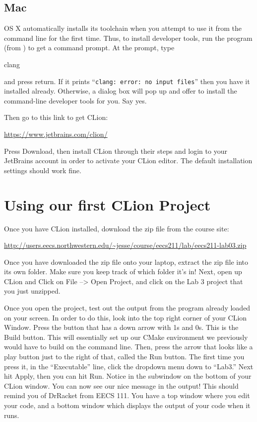 \documentclass{tufte-handout}
\begin{document}
\subsection{Mac}

OS X automatically installs its toolchain when you
attempt to use it from the command line for the first time. Thus, to
install developer tools, run the  program (from
) to get a command prompt. At the prompt, type

\begin{CmdLine}
  \prompt clang
\end{CmdLine}

\noindent
and press return. If it prints ``\texttt{clang: error: no input files}''
then you have it installed already. Otherwise, a dialog box will pop up
and offer to install the command-line developer tools for you. Say yes.

Then go to this link to get CLion:

\medskip
\url{https://www.jetbrains.com/clion/}

\medskip\noindent
Press Download, then install CLion through their steps and login to your
JetBrains account in order to activate your CLion editor. The default
installation settings should work fine.

\section{Using our first CLion Project}

Once you have CLion installed, download the zip file from the course
site: \medskip

\url{http://users.eecs.northwestern.edu/~jesse/course/eecs211/lab/eecs211-lab03.zip} \medskip

\noindent
Once you have downloaded the zip file onto your laptop, extract the zip file into its own folder. Make sure you keep track of which folder it's in!  Next, open up CLion and Click on File --> Open Project, and click on the Lab 3 project that you just unzipped. 

Once you open the project, test out the output from the program already loaded on your screen.  In order to do this, look into the top right corner of your CLion Window.  Press the button that has a down arrow with 1s and 0s.  This is the Build button.  This will essentially set up our CMake environment we previously would have to build on the command line. Then, press the arrow that looks like a play button just to the right of that, called the Run button.  The first time you press it, in the ``Executable'' line, click the dropdown menu down to ``Lab3.''  Next hit Apply, then you can hit Run.  Notice in the subwindow on the bottom of your CLion window. You can now see our nice message in the output! This should remind you of DrRacket from EECS 111. You have a top window where you edit your code, and a bottom window which displays the output of your code when it runs.
\end{document}
